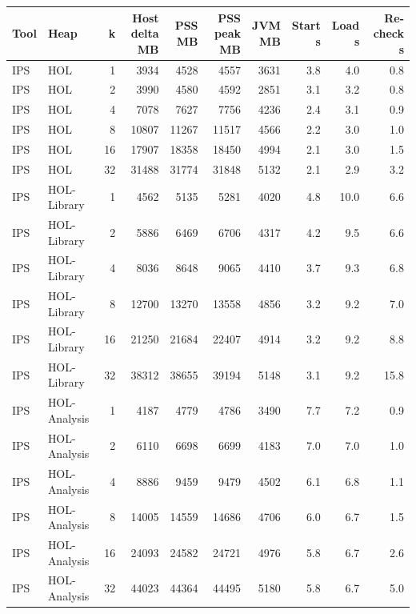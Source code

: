 \documentclass[11pt]{article}
\begin{document}
\begin{table}[p]
\centering\scriptsize
\setlength{\tabcolsep}{4pt}
\begin{tabular}{@{}llrrrrrrrr@{}}
\toprule
Tool & Heap & k & \shortstack{Host delta\\MB} & \shortstack{PSS\\MB} & \shortstack{PSS peak\\MB} & \shortstack{JVM\\MB} & \shortstack{Start\\s} & \shortstack{Load\\s} & \shortstack{Re-check\\s} \\
\midrule
IPS & HOL & 1 & 3934 & 4528 & 4557 & 3631 & 3.8 & 4.0 & 0.8 \\
IPS & HOL & 2 & 3990 & 4580 & 4592 & 2851 & 3.1 & 3.2 & 0.8 \\
IPS & HOL & 4 & 7078 & 7627 & 7756 & 4236 & 2.4 & 3.1 & 0.9 \\
IPS & HOL & 8 & 10807 & 11267 & 11517 & 4566 & 2.2 & 3.0 & 1.0 \\
IPS & HOL & 16 & 17907 & 18358 & 18450 & 4994 & 2.1 & 3.0 & 1.5 \\
IPS & HOL & 32 & 31488 & 31774 & 31848 & 5132 & 2.1 & 2.9 & 3.2 \\
IPS & HOL-Library & 1 & 4562 & 5135 & 5281 & 4020 & 4.8 & 10.0 & 6.6 \\
IPS & HOL-Library & 2 & 5886 & 6469 & 6706 & 4317 & 4.2 & 9.5 & 6.6 \\
IPS & HOL-Library & 4 & 8036 & 8648 & 9065 & 4410 & 3.7 & 9.3 & 6.8 \\
IPS & HOL-Library & 8 & 12700 & 13270 & 13558 & 4856 & 3.2 & 9.2 & 7.0 \\
IPS & HOL-Library & 16 & 21250 & 21684 & 22407 & 4914 & 3.2 & 9.2 & 8.8 \\
IPS & HOL-Library & 32 & 38312 & 38655 & 39194 & 5148 & 3.1 & 9.2 & 15.8 \\
IPS & HOL-Analysis & 1 & 4187 & 4779 & 4786 & 3490 & 7.7 & 7.2 & 0.9 \\
IPS & HOL-Analysis & 2 & 6110 & 6698 & 6699 & 4183 & 7.0 & 7.0 & 1.0 \\
IPS & HOL-Analysis & 4 & 8886 & 9459 & 9479 & 4502 & 6.1 & 6.8 & 1.1 \\
IPS & HOL-Analysis & 8 & 14005 & 14559 & 14686 & 4706 & 6.0 & 6.7 & 1.5 \\
IPS & HOL-Analysis & 16 & 24093 & 24582 & 24721 & 4976 & 5.8 & 6.7 & 2.6 \\
IPS & HOL-Analysis & 32 & 44023 & 44364 & 44495 & 5180 & 5.8 & 6.7 & 5.0 \\

\end{tabular}
\end{table}
\end{document}
